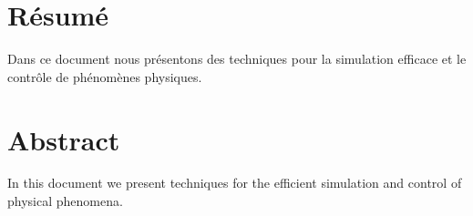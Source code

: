 
\chapter{R\'esum\'e}
Dans ce document nous pr\'esentons des techniques pour la simulation efficace et le contr\^ole de ph\'enom\`enes physiques.

\chapter{Abstract}
In this document we present techniques for the efficient simulation and control of physical phenomena.